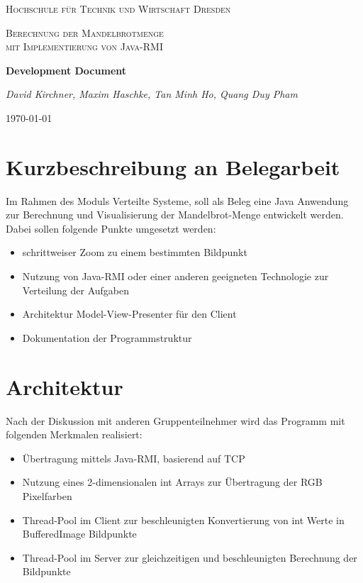 \documentclass{article}
\begin{document}
\begin{titlepage}
    \centering
    {\scshape\LARGE Hochschule für Technik und Wirtschaft Dresden \par}
    \vspace{1cm}
    {\scshape\Large Berechnung der Mandelbrotmenge \\mit Implementierung von Java-RMI \par}
    \vspace{1.5cm}
    {\huge\bfseries Development Document\par}
    \vspace{2cm}
    {\Large\itshape David Kirchner, Maxim Haschke, Tan Minh Ho, Quang Duy Pham\par}
    \vfill

    {\large \today\par}
\end{titlepage}

\tableofcontents

\newpage
\section{Kurzbeschreibung an Belegarbeit}
	Im Rahmen des Moduls Verteilte Systeme, soll als Beleg eine Java Anwendung zur Berechnung und Visualisierung der Mandelbrot-Menge entwickelt werden. Dabei sollen folgende Punkte umgesetzt werden:
	\begin{itemize}
		\item schrittweiser Zoom zu einem bestimmten Bildpunkt
		\item Nutzung von Java-RMI oder einer anderen geeigneten Technologie zur Verteilung der Aufgaben
		\item Architektur Model-View-Presenter für den Client
		\item Dokumentation der Programmstruktur
	\end{itemize}

\section{Architektur}
	Nach der Diskussion mit anderen Gruppenteilnehmer wird das Programm mit folgenden Merkmalen realisiert:
	\begin{itemize}
		\item Übertragung mittels Java-RMI, basierend auf TCP
		\item Nutzung eines 2-dimensionalen int Arrays zur Übertragung der RGB Pixelfarben
		\item Thread-Pool im Client zur beschleunigten Konvertierung von int Werte in BufferedImage Bildpunkte
		\item Thread-Pool im Server zur gleichzeitigen und beschleunigten Berechnung der Bildpunkte
	\end{itemize}
	
\end{document}
